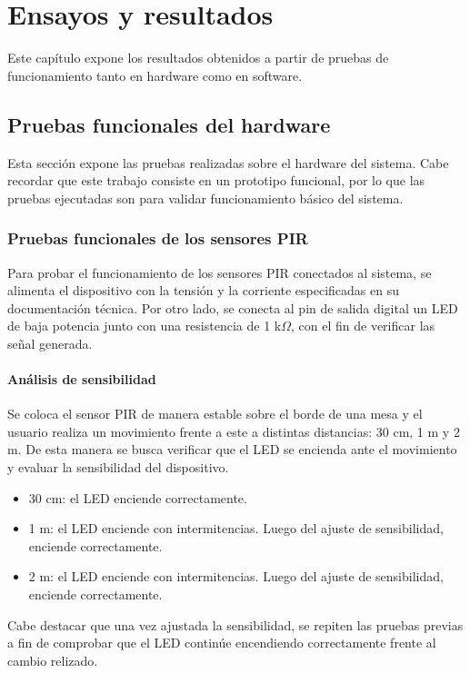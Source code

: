 
\chapter{Ensayos y resultados} %

\label{Chapter4} %
Este capítulo expone los resultados obtenidos a partir de pruebas de funcionamiento tanto en hardware como en software.


\section{Pruebas funcionales del hardware}
\label{sec:pruebasHW}
Esta sección expone las pruebas realizadas sobre el hardware del sistema. Cabe recordar que este trabajo consiste en un prototipo funcional, por lo que las pruebas ejecutadas son para validar funcionamiento básico del sistema.

\subsection{Pruebas funcionales de los sensores PIR}
Para probar el funcionamiento de los sensores PIR conectados al sistema, se alimenta el dispositivo con la tensión y la corriente especificadas en su documentación técnica. Por otro lado, se conecta al pin de salida digital un LED de baja potencia junto con una resistencia de 1 k$\Omega$, con el fin de verificar las señal generada.

\subsubsection{Análisis de sensibilidad}
Se coloca el sensor PIR de manera estable sobre el borde de una mesa y el usuario realiza un movimiento frente a este a distintas distancias: 30 cm, 1 m y 2 m. De esta manera se busca verificar que el LED se encienda ante el movimiento y evaluar la sensibilidad del dispositivo.
\begin{itemize}
    \item 30 cm: el LED enciende correctamente. 
    \item 1 m: el LED enciende con intermitencias. Luego del ajuste de sensibilidad, enciende correctamente.
    \item 2 m: el LED enciende con intermitencias. Luego del ajuste de sensibilidad, enciende correctamente.
\end{itemize}
Cabe destacar que una vez ajustada la sensibilidad, se repiten las pruebas previas a fin de comprobar que el LED continúe encendiendo correctamente frente al cambio relizado.
